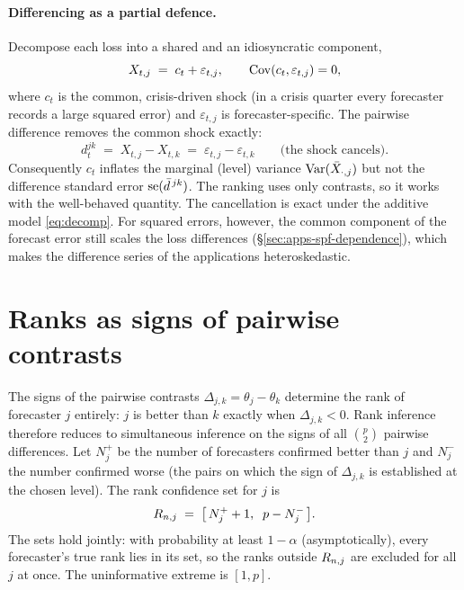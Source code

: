 \paragraph{Differencing as a partial defence.} Decompose each loss into a shared and an
idiosyncratic component,
\begin{equation}
  X_{t,j} \;=\; c_t + \varepsilon_{t,j},
  \qquad \operatorname{Cov}(c_t,\varepsilon_{t,j}) = 0,
  \label{eq:decomp}
\end{equation}
where $c_t$ is the common, crisis-driven shock (in a crisis quarter every forecaster
records a large squared error) and $\varepsilon_{t,j}$ is forecaster-specific. The
pairwise difference removes the common shock exactly:
\begin{equation}
  d^{jk}_t \;=\; X_{t,j} - X_{t,k}
  \;=\; \varepsilon_{t,j} - \varepsilon_{t,k}
  \qquad\text{(the shock cancels).}
  \label{eq:cancel}
\end{equation}
Consequently $c_t$ inflates the marginal (level) variance $\operatorname{Var}(\bar{X}_{\cdot,j})$ but
not the difference standard error $\mathrm{se}(\bar{d}^{\,jk})$. The ranking uses only contrasts,
so it works with the well-behaved quantity. The cancellation is exact under the additive
model \eqref{eq:decomp}. For squared errors, however, the common component of the
forecast error still scales the loss differences (\S\ref{sec:apps-spf-dependence}),
which makes the difference series of the applications heteroskedastic.

\section{Ranks as signs of pairwise contrasts}
\label{sec:ranks}

The signs of the pairwise contrasts $\Delta_{j,k}=\theta_j-\theta_k$ determine the rank
of forecaster $j$ entirely: $j$ is better than $k$ exactly when $\Delta_{j,k}<0$. Rank
inference therefore reduces to simultaneous inference on the signs of all $\binom{p}{2}$
pairwise differences. Let $N^+_j$ be the number of forecasters confirmed better than $j$
and $N^-_j$ the number confirmed worse (the pairs on which the sign of $\Delta_{j,k}$ is
established at the chosen level). The rank confidence set for $j$ is
\begin{equation}
  R_{n,j} \;=\; \big[\,N^+_j+1,\;\; p-N^-_j\,\big].
  \label{eq:rankset}
\end{equation}
The sets hold jointly: with probability at least $1-\alpha$ (asymptotically), every
forecaster's true rank lies in its set, so the ranks outside $R_{n,j}$ are excluded
for all $j$ at once. The uninformative extreme is $[1,p]$.

